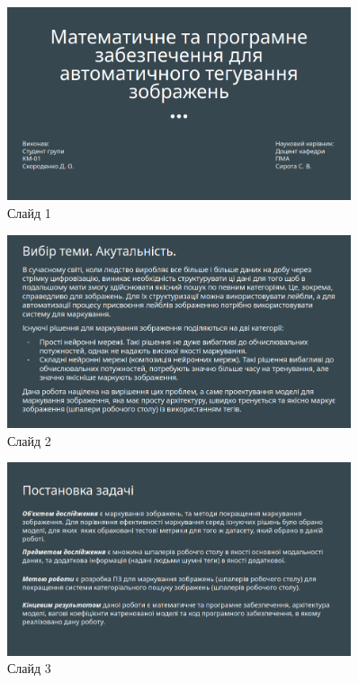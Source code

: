 \documentclass{udstu}
\begin{document}

\begin{figure}[!ht]
	\centering
	\includegraphics[width=0.9\textwidth]{PNG/present/present-1}
	\caption{Слайд 1}
\end{figure}

\begin{figure}[!ht]
	\centering
	\includegraphics[width=0.9\textwidth]{PNG/present/present-2}
	\caption{Слайд 2}
\end{figure}

\begin{figure}[!ht]
	\centering
	\includegraphics[width=0.9\textwidth]{PNG/present/present-3}
	\caption{Слайд 3}
\end{figure}
\end{document}
